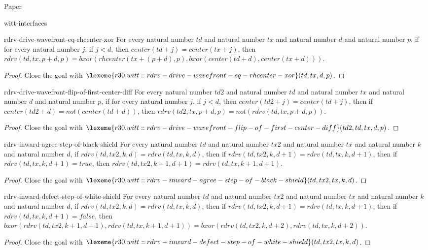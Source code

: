 \begin{lexlean}{Paper}
\begin{section}{witt-interfaces}
  \begin{theorem}{rdrv-drive-wavefront-eq-rhcenter-xor}
  For every natural number \(td\) and natural number \(tx\) and natural number \(d\) and natural number \(p\), if for every natural number \(j\), if \(j < d\), then \(center(td + j) = center(tx + j)\), then \(rdrv(td, tx, p + d, p) = bxor(rhcenter(tx + (p + d), p), bxor(center(td + d), center(tx + d)))\).
  \begin{proof}
  Close the goal with \(\lexeme{r30.witt::rdrv-drive-wavefront-eq-rhcenter-xor}(td, tx, d, p)\).
  \end{proof}
  \end{theorem}

  \begin{theorem}{rdrv-drive-wavefront-flip-of-first-center-diff}
  For every natural number \(td2\) and natural number \(td\) and natural number \(tx\) and natural number \(d\) and natural number \(p\), if for every natural number \(j\), if \(j < d\), then \(center(td2 + j) = center(td + j)\), then if \(center(td2 + d) = not(center(td + d))\), then \(rdrv(td2, tx, p + d, p) = not(rdrv(td, tx, p + d, p))\).
  \begin{proof}
  Close the goal with \(\lexeme{r30.witt::rdrv-drive-wavefront-flip-of-first-center-diff}(td2, td, tx, d, p)\).
  \end{proof}
  \end{theorem}

  \begin{theorem}{rdrv-inward-agree-step-of-black-shield}
  For every natural number \(td\) and natural number \(tx2\) and natural number \(tx\) and natural number \(k\) and natural number \(d\), if \(rdrv(td, tx2, k, d) = rdrv(td, tx, k, d)\), then if \(rdrv(td, tx2, k, d + 1) = rdrv(td, tx, k, d + 1)\), then if \(rdrv(td, tx, k, d + 1) = true\), then \(rdrv(td, tx2, k + 1, d + 1) = rdrv(td, tx, k + 1, d + 1)\).
  \begin{proof}
  Close the goal with \(\lexeme{r30.witt::rdrv-inward-agree-step-of-black-shield}(td, tx2, tx, k, d)\).
  \end{proof}
  \end{theorem}

  \begin{theorem}{rdrv-inward-defect-step-of-white-shield}
  For every natural number \(td\) and natural number \(tx2\) and natural number \(tx\) and natural number \(k\) and natural number \(d\), if \(rdrv(td, tx2, k, d) = rdrv(td, tx, k, d)\), then if \(rdrv(td, tx2, k, d + 1) = rdrv(td, tx, k, d + 1)\), then if \(rdrv(td, tx, k, d + 1) = false\), then \(bxor(rdrv(td, tx2, k + 1, d + 1), rdrv(td, tx, k + 1, d + 1)) = bxor(rdrv(td, tx2, k, d + 2), rdrv(td, tx, k, d + 2))\).
  \begin{proof}
  Close the goal with \(\lexeme{r30.witt::rdrv-inward-defect-step-of-white-shield}(td, tx2, tx, k, d)\).
  \end{proof}
  \end{theorem}


\end{section}
\end{lexlean}
